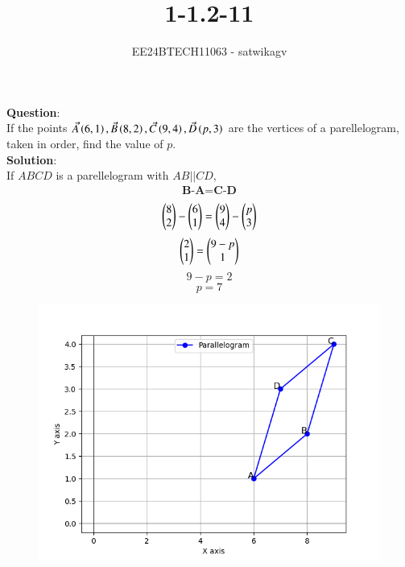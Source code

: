 \documentclass[journal]{IEEEtran}
\begin{document}

\vspace{3cm}

\title{1-1.2-11}
\author{EE24BTECH11063 - satwikagv}
{\let\newpage\relax\maketitle}

\renewcommand{\thefigure}{\theenumi}
\renewcommand{\thetable}{\theenumi}
\setlength{\intextsep}{10pt} %


\renewcommand{\thetable}{\theenumi}


\textbf{Question}:\\
If the points $\Vec{A}\left(6,1\right),\Vec{B}\left(8,2\right),\Vec{C}\left(9,4\right),\Vec{D}\left(p,3\right)$ are the vertices of a parellelogram, taken in order, find the value of $p$.\\
\textbf{Solution}: \\If $ABCD$ is a parellelogram with $AB||CD$,\\
\begin{align}{\textbf{B-A=C-D}} 
\end{align}
$$\begin{pmatrix}8\\2\end{pmatrix}-\begin{pmatrix}6\\1\end{pmatrix}=\begin{pmatrix}9\\4\end{pmatrix}-\begin{pmatrix}p\\3\end{pmatrix}$$
$$\begin{pmatrix}2\\1\end{pmatrix}=\begin{pmatrix}9-p\\1\end{pmatrix}$$
$$9-p=2$$
$$p=7$$
\begin{figure}[h!]
   \centering
   \includegraphics[width=0.7\linewidth]{figs/parallelogram_plot.png}
\end{figure}
\end{document}
